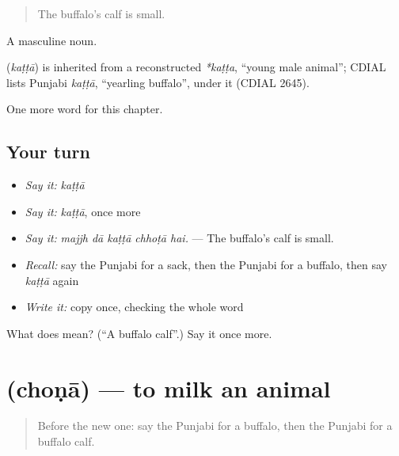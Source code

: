 \begin{quote}
The buffalo's calf is small.
\end{quote}

A masculine noun.

\begin{cousinweb}
\textbf{} (\emph{kaṭṭā}) is inherited from a reconstructed \emph{*kaṭṭa}, \textquotedblleft{}young male animal\textquotedblright{}; CDIAL lists Punjabi \emph{kaṭṭā}, \textquotedblleft{}yearling buffalo\textquotedblright{}, under it (CDIAL 2645).
\end{cousinweb}

\begin{grammarlens}[title={What you've built}]
One more word for this chapter.
\end{grammarlens}

\subsection*{Your turn}
\begin{itemize}
\raggedright
  \item \emph{Say it:} \emph{kaṭṭā}
  \item \emph{Say it:} \emph{kaṭṭā}, once more
  \item \emph{Say it:} \emph{majjh dā kaṭṭā chhoṭā hai.} — The buffalo's calf is small.
  \item \emph{Recall:} say the Punjabi for a sack, then the Punjabi for a buffalo, then say \emph{kaṭṭā} again
  \item \emph{Write it:} copy \textbf{} once, checking the whole word
\end{itemize}

\begin{tcolorbox}[breakable,colback=teal!4,colframe=teal!35!black,title={Before you move on}]
What does  mean? (\textquotedblleft{}A buffalo calf\textquotedblright{}.) Say it once more.
\end{tcolorbox}
\section[\texorpdfstring{\pa{ਚੋਣਾ} (choṇā)}{ਚੋਣਾ (choṇā)}]{ (choṇā) — to milk an animal}

\label{lesson:PA-C307-chona}



\begin{quote}
Before the new one: say the Punjabi for a buffalo, then the Punjabi for a buffalo calf.
\end{quote}

